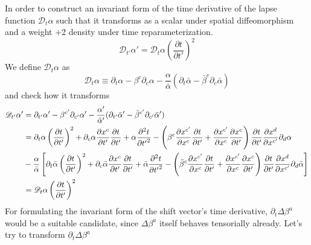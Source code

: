 \documentclass[letterpaper,nofootinbib,prd,amsmath,onecolumn]{revtex4-1}
\begin{document}
In order to construct an invariant form of the time derivative of the lapse function $\mathscr{D}_{t}\alpha$ such that it transforms as a scalar under spatial diffeomorphism and a weight +2 density under time reparameterization.
\[
\mathscr{D}_{t'}\alpha' = \mathscr{D}_{t}\alpha\left(\frac{\partial t}{\partial t'}\right)^{2}
\]
We define $\mathscr{D}_{t}\alpha$ as
\begin{equation}
\mathscr{D}_{t}\alpha \equiv \partial_{t}\alpha - \beta^{c}\partial_{c}\alpha - \frac{\alpha}{{\bar \alpha}}(\partial_{t}{\bar \alpha} - {\bar \beta}^{c}\partial_{c}{\bar \alpha})
\end{equation}
and check how it transforms
\begin{align}
\mathscr{D}_{t'}\alpha' & = \partial_{t'}\alpha' - \beta^{c'}\partial_{c'}\alpha' - \frac{\alpha'}{{\bar \alpha}'}(\partial_{t'}{\bar \alpha}' - {\bar \beta}^{c'}\partial_{c'}{\bar \alpha}')\notag\\
& = \partial_{t}\alpha\left(\frac{\partial t}{\partial t'}\right)^{2} + \partial_{c}\alpha\frac{\partial x^{c}}{\partial t'}\frac{\partial t}{\partial t'} + \alpha\frac{\partial^{2}t}{\partial {t'}^{2}} - \left(\beta^{c}\frac{\partial x^{c'}}{\partial x^{c}}\frac{\partial t}{\partial t'} + \frac{\partial x^{c'}}{\partial x^{c}}\frac{\partial x^{c}}{\partial t'}\right)\frac{\partial t}{\partial t'}\frac{\partial x^{d}}{\partial x^{c'}}\partial_{d}\alpha\notag\\
& - \frac{\alpha}{{\bar \alpha}}\left[\partial_{t}{\bar \alpha}\left(\frac{\partial t}{\partial t'}\right)^{2} + \partial_{c}{\bar \alpha}\frac{\partial x^{c}}{\partial t'}\frac{\partial t}{\partial t'} + {\bar \alpha}\frac{\partial^{2}t}{\partial {t'}^{2}} - \left({\bar\beta}^{c}\frac{\partial x^{c'}}{\partial x^{c}}\frac{\partial t}{\partial t'} + \frac{\partial x^{c'}}{\partial x^{c}}\frac{\partial x^{c}}{\partial t'}\right)\frac{\partial t}{\partial t'}\frac{\partial x^{d}}{\partial x^{c'}}\partial_{d}{\bar\alpha}\right]\notag\\
& = \mathscr{D}_{t}\alpha\left(\frac{\partial t}{\partial t'}\right)^{2}
\end{align}
For formulating the invariant form of the shift vector's time derivative, $\partial_{t}\Delta \beta^{a}$ would be a suitable candidate, since $\Delta \beta^{a}$ itself behaves tensorially already. Let's try to transform $\partial_{t} \Delta \beta^{a}$
\end{document}
